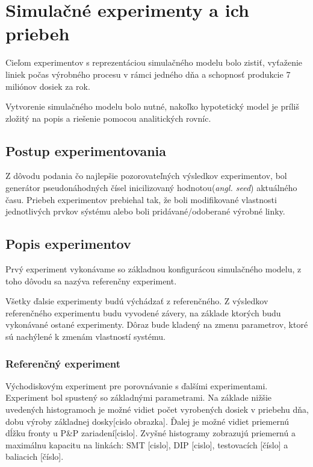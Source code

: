 \documentclass[12pt,a4paper,titlepage,final]{article}
\begin{document}
\section{Simulačné experimenty a ich priebeh}
Cieľom experimentov s reprezentáciou simulačného modelu bolo zistiť, vyťaženie
liniek počas výrobného procesu v rámci jedného dňa a schopnosť produkcie 7 miliónov
dosiek za rok.

Vytvorenie simulačného modelu bolo nutné, nakoľko hypotetický model je príliš
zložitý na popis a riešenie pomocou analitických rovníc.

\subsection{Postup experimentovania}
Z dôvodu podania čo najlepšie pozorovateľných výsledkov experimentov, bol 
generátor pseudonáhodných čísel inicilizovaný hodnotou(\textit{angl. seed})
aktuálného času. Priebeh experimentov prebiehal tak, že boli modifikované 
vlastnosti jednotlivých prvkov sýstému alebo boli pridávané/odoberané výrobné
linky.

\subsection{Popis experimentov}
Prvý experiment vykonávame so základnou konfigurácou simulačného modelu, z toho 
dôvodu sa nazýva referenčny experiment. 

Všetky ďalsie experimenty budú výchádzať z referenčného. Z výsledkov referenčného
experimentu budu vyvodené závery, na základe ktorých budu vykonávané ostané experimenty.
Dôraz bude kladený na zmenu parametrov, ktoré sú nachýlené k zmenám vlastností
systému.

\subsubsection{Referenčný experiment}
Východiskovým experiment pre porovnávanie s ďalšími experimentami.
Experiment bol spustený so základnými parametrami. Na základe nižšie uvedených histogramoch
je možné vidiet počet vyrobených dosiek v priebehu dňa, dobu 
výroby základnej dosky[cislo obrazka]. Ďalej je možné vidiet priemernú dĺžku
fronty u P\&P zariadení[cislo]. Zvyšné histogramy zobrazujú priemernú a maximálnu
kapacitu na linkách: SMT [cislo], DIP [cislo], testovacích [číslo] a baliacich [číslo].
\end{document}
